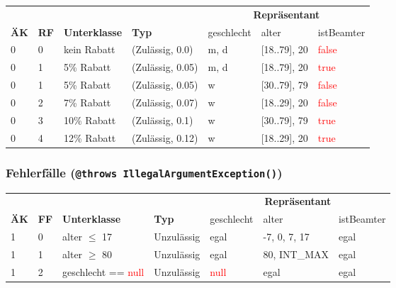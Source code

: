\documentclass{article}
\begin{document}
\begin{enumerate}[label=\alph*.]
            \begin{tabularx}{\textwidth}{|p{3em}|p{3em}|X|p{7em}|p{5em}|p{7em}|p{5em}|}
                \hline
                \cellcolor[gray]{0.75} & \cellcolor[gray]{0.75} & \cellcolor[gray]{0.75} & \cellcolor[gray]{0.75} & \multicolumn{3}{c|}{\cellcolor[gray]{0.75} \textbf{Repräsentant}}\\
                \multirow{-2}{*}{\cellcolor[gray]{0.75} \textbf{ÄK}} & \multirow{-2}{*}{\cellcolor[gray]{0.75} \textbf{RF}} & \multirow{-2}{*}{\cellcolor[gray]{0.75} \textbf{Unterklasse}} & \multirow{-2}{*}{\cellcolor[gray]{0.75} \textbf{Typ}} & \cellcolor[gray]{0.75} geschlecht & \cellcolor[gray]{0.75} alter & \cellcolor[gray]{0.75} istBeamter\\\hline  
                0 & 0 & kein Rabatt & (Zulässig, 0.0) & m, d & [18..79], 20 & \textcolor{red}{false}\\\hline
                0 & 1 & 5\% Rabatt & (Zulässig, 0.05) & m, d & [18..79], 20 & \textcolor{red}{true}\\\hline
                0 & 1 & 5\% Rabatt & (Zulässig, 0.05) & w & [30..79], 79 & \textcolor{red}{false}\\\hline
                0 & 2 & 7\% Rabatt & (Zulässig, 0.07) & w & [18..29], 20 & \textcolor{red}{false}\\\hline
                0 & 3 & 10\% Rabatt & (Zulässig, 0.1) & w & [30..79], 79 & \textcolor{red}{true}\\\hline
                0 & 4 & 12\% Rabatt & (Zulässig, 0.12) & w & [18..29], 20 & \textcolor{red}{true}\\\hline
            \end{tabularx}

            \subsubsection*{Fehlerfälle (\texttt{@throws IllegalArgumentException()})}

            \begin{tabularx}{\textwidth}{|p{3em}|p{3em}|X|p{7em}|p{5em}|p{7em}|p{5em}|}
                \hline
                \cellcolor[gray]{0.75} & \cellcolor[gray]{0.75} & \cellcolor[gray]{0.75} & \cellcolor[gray]{0.75} & \multicolumn{3}{c|}{\cellcolor[gray]{0.75} \textbf{Repräsentant}}\\
                \multirow{-2}{*}{\cellcolor[gray]{0.75} \textbf{ÄK}} & \multirow{-2}{*}{\cellcolor[gray]{0.75} \textbf{FF}} & \multirow{-2}{*}{\cellcolor[gray]{0.75} \textbf{Unterklasse}} & \multirow{-2}{*}{\cellcolor[gray]{0.75} \textbf{Typ}} & \cellcolor[gray]{0.75} geschlecht & \cellcolor[gray]{0.75} alter & \cellcolor[gray]{0.75} istBeamter\\\hline  
                1 & 0 & alter $\leq$ 17 & Unzulässig & egal & -7, 0, 7, 17 & egal\\\hline
                1 & 1 & alter $\geq$ 80 & Unzulässig & egal & 80, INT\_MAX & egal\\\hline
                1 & 2 & geschlecht == \textcolor{red}{null} & Unzulässig & \textcolor{red}{null} & egal & egal\\\hline
            \end{tabularx}


\end{enumerate}
\end{document}
